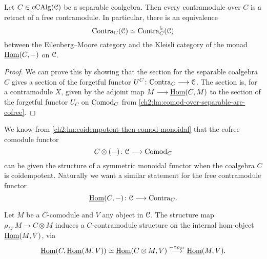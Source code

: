 \begin{proposition}
    \label{ch2:prop:contra-over-separable-are-free}
    Let $C\in \operatorname{cCAlg}(\EuScript{C})$ be a separable coalgebra. Then every contramodule over $C$ is a retract of a free contramodule. In particular, there is an equivalence 
    \[\mathrm{Contra}_C(\EuScript{C})\simeq \mathrm{Contra}_C^{\mathrm{fr}}(\EuScript{C})\]
    between the Eilenberg--Moore category and the Kleisli category of the monad $\operatorname{\underline{Hom}}(C,-)$ on $\EuScript{C}$. 
\end{proposition}
\begin{proof}
    We can prove this by showing that the section for the separable coalgebra $C$ gives a section of the forgetful functor $U^C\colon\mathrm{Contra}_C\longrightarrow \EuScript{C}$. The section is, for a contramodule $X$, given by the adjoint map $M\longrightarrow \operatorname{\underline{Hom}}(C, M)$ to the section of the forgetful functor $U_C$ on $\mathrm{Comod}_C$ from \cref{ch2:lm:comod-over-separable-are-cofree}.  
\end{proof}


We know from \cref{ch2:lm:coidempotent-then-comod-monoidal} that the cofree comodule functor 
\[C\otimes(-)\colon \EuScript{C}\longrightarrow \mathrm{Comod}_C\]
can be given the structure of a symmetric monoidal functor when the coalgebra $C$ is coidempotent. Naturally we want a similar statement for the free contramodule functor 
\[\operatorname{\underline{Hom}}(C,-)\colon \EuScript{C}\longrightarrow \mathrm{Contra}_C.\]

\begin{remark}
    \label{ch2:rm:contramodule-structure-on-hom-from-comodule}
    Let $M$ be a $C$-comodule and $V$ any object in $\EuScript{C}$. The structure map $\rho_M\: M\to C\otimes M$ induces a $C$-contramodule structure on the internal hom-object $\operatorname{\underline{Hom}}(M, V)$, via 
    \[\operatorname{\underline{Hom}}(C, \operatorname{\underline{Hom}}(M, V))\simeq \operatorname{\underline{Hom}}(C\otimes M, V)\overset{-\circ \rho_M}{\longrightarrow} \operatorname{\underline{Hom}}(M, V).\]
\end{remark}

